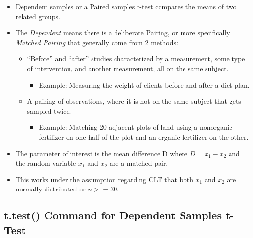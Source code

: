 \documentclass[
  letterpaper,
  DIV=11,
  numbers=noendperiod]{scrreprt}
\providecommand{\tightlist}{%
  \setlength{\itemsep}{0pt}\setlength{\parskip}{0pt}}\usepackage{longtable,booktabs,array}
\begin{document}
\begin{itemize}
\tightlist
\item
  Dependent samples or a Paired samples t-test compares the means of two
  related groups.
\item
  The \emph{Dependent} means there is a deliberate Pairing, or more
  specifically \emph{Matched Pairing} that generally come from 2
  methods:

  \begin{itemize}
  \tightlist
  \item
    ``Before'' and ``after'' studies characterized by a measurement,
    some type of intervention, and another measurement, all on the same
    subject.

    \begin{itemize}
    \tightlist
    \item
      Example: Measuring the weight of clients before and after a diet
      plan.
    \end{itemize}
  \item
    A pairing of observations, where it is not on the same subject that
    gets sampled twice.

    \begin{itemize}
    \tightlist
    \item
      Example: Matching 20 adjacent plots of land using a nonorganic
      fertilizer on one half of the plot and an organic fertilizer on
      the other.
    \end{itemize}
  \end{itemize}
\item
  The parameter of interest is the mean difference D where
  \(D = x_1 - x_2\) and the random variable \(x_1\) and \(x_2\) are a
  matched pair.
\item
  This works under the assumption regarding CLT that both \(x_1\) and
  \(x_2\) are normally distributed or \(n >= 30\).
\end{itemize}

\subsection{t.test() Command for Dependent Samples
t-Test}\label{t.test-command-for-dependent-samples-t-test}
\end{document}
